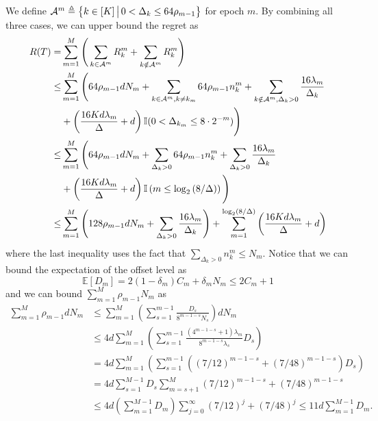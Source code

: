 We define ${\mathcal{A}}^m\triangleq\left\{ k\in[K]\,\big|\,0<\Delta_k\le 64\rho_{m-1} \right\}$ for epoch $m$. By combining all three cases, we can upper bound the regret as
\begin{equation}\label{eq:dsmab-regret}
\begin{split}
R(T)=&\sum_{m=1}^M\Bigg(\sum_{k \in \mathcal{A}^m} R_k^m + \sum_{k \notin \mathcal{A}^m} R_k^m\Bigg)\\    
\le& \sum_{m=1}^M\Bigg( 64\rho_{m-1}d N_m+\sum_{k \in \mathcal{A}^m,k\neq k_m} 64\rho_{m-1}n_k^m + \sum_{k \notin \mathcal{A}^m, \Delta_k>0} \frac{16\lambda_m}{\Delta_k}\\
&+ \left(\frac{16Kd\lambda_m}{\Delta} + d\right){\mathbb{I}}(0<\Delta_{k_m} \le 8 \cdot 2^{-m}) \Bigg)\\ 
\le& \sum_{m=1}^M\Bigg( 64\rho_{m-1}dN_m+\sum_{\Delta_k>0} 64\rho_{m-1}n_k^m + \sum_{\Delta_k>0} \frac{16\lambda_m}{\Delta_k} \\
&+ \left(\frac{16Kd\lambda_m}{\Delta} + d\right){\mathbb{I}}\left(m\le \log_2\left(8/\Delta\right)\right)\Bigg)\\ 
\le& \sum_{m=1}^M\Bigg( 128\rho_{m-1}dN_m + \sum_{\Delta_k>0} \frac{16\lambda_m}{\Delta_k}\Bigg)+ \sum_{m=1}^{\log_2(8/\Delta)}\left(\frac{16Kd\lambda_m}{\Delta} + d\right)
\end{split}
\end{equation}
where the last inequality uses the fact that $\sum_{\Delta_k>0} n_k^m\le N_m$. Notice that we can bound the expectation of the offset level as
\[\mathbb{E}[D_m] = 2(1-\delta_m)C_m + \delta_m N_m \leq 2C_m + 1\]
and we can bound $\sum_{m=1}^M \rho_{m-1} N_m$ as
\begin{equation}\label{eq:dsmab-rho}
    \begin{split}
        \sum_{m=1}^M \rho_{m-1} dN_m
        &\leq \sum_{m=1}^M \left(\sum_{s=1}^{m-1}\frac{D_s}{8^{m-1-s}N_s}\right)dN_m \\
        &\leq 4d\sum_{m=1}^M \left(\sum_{s=1}^{m-1}\frac{(4^{m-1-s} + 1)\lambda_m}{8^{m-1-s}\lambda_s}D_s\right) \\
        &= 4d\sum_{m=1}^M \left(\sum_{s=1}^{m-1}((7/12)^{m-1-s} + (7/48)^{m-1-s})D_s\right) \\
        &= 4d\sum_{s=1}^{M-1} D_s \sum_{m=s+1}^M (7/12)^{m-1-s} + (7/48)^{m-1-s}\\
        &\leq 4d\left(\sum_{m=1}^{M-1} D_m\right)\sum_{j=0}^{\infty} \left(7/12\right)^{j} + \left(7/48\right)^{j} 
        \leq 11d\sum_{m=1}^{M-1} D_m.
    \end{split}
\end{equation}
